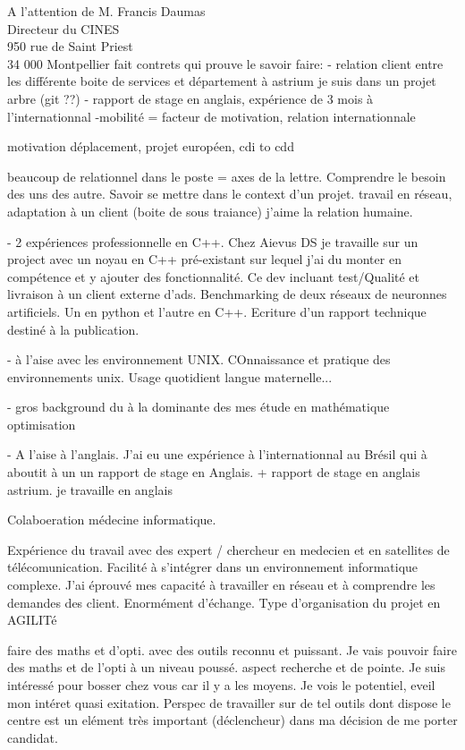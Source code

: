 \documentclass[12pt]{lettre}
\begin{document}
\begin{letter}{A l'attention de M. Francis Daumas\\Directeur du CINES\\950 rue de Saint Priest\\34 000 Montpellier}
fait contrets qui prouve le savoir faire:
- relation client entre les différente boite de services et département à astrium
je suis dans un projet arbre (git ??)
- rapport de stage en anglais, expérience de 3 mois à l'internationnal
-mobilité = facteur de motivation,  relation internationnale

motivation
déplacement, projet européen, cdi to cdd



beaucoup de relationnel dans le poste = axes de la lettre. Comprendre le besoin des uns des autre. Savoir se mettre dans le context d'un projet.
travail en réseau, adaptation à un client (boite de sous traiance) j'aime la relation humaine.

{
 - 2 expériences professionnelle en C++.
 Chez Aievus DS je travaille sur un project avec un noyau en C++ pré-existant sur lequel j'ai du monter en compétence et y ajouter des fonctionnalité. Ce dev incluant test/Qualité et livraison à un client externe d'ads.
 Benchmarking de deux réseaux de neuronnes artificiels. Un en python et l'autre en C++. Ecriture d'un rapport technique destiné à la publication.

 - à l'aise avec les environnement UNIX. COnnaissance et pratique des environnements unix. Usage quotidient langue maternelle...

- gros background du à la dominante des mes étude en mathématique optimisation

 - A l'aise à l'anglais. J'ai eu une expérience à l'internationnal au Brésil qui à aboutit à un un rapport de stage en Anglais. + rapport de stage en anglais astrium. je travaille en anglais

 Colaboeration médecine informatique.

 Expérience du travail avec des expert / chercheur en medecien et en satellites de télécomunication. Facilité à s'intégrer dans un environnement informatique complexe. J'ai éprouvé mes capacité à travailler en réseau et à comprendre les demandes des client. Enormément d'échange. Type d'organisation du projet en AGILITé
}

{
 faire des maths et d'opti. avec des outils reconnu et puissant. Je vais pouvoir faire des maths et de l'opti à un niveau poussé. aspect recherche et de pointe. Je suis intéressé pour bosser chez vous car il y a les moyens. Je vois le potentiel, eveil mon intéret quasi exitation. Perspec de travailler sur de tel outils dont dispose le centre est un elément très important (déclencheur) dans ma décision de me porter candidat.

}
\end{letter}
\end{document}
